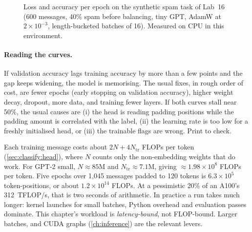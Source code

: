 \begin{figure}[ht]
\centering
{}
\caption{Loss and accuracy per epoch on the synthetic spam task of Lab~16 (600 messages,
40\% spam before balancing, tiny GPT, AdamW at $2\times10^{-3}$, length-bucketed batches
of 16). Measured on CPU in this environment.}
\label{fig:classify:curves}
\end{figure}

\paragraph{Reading the curves.} If validation accuracy lags training accuracy by more
than a few points and the gap keeps widening, the model is memorising. The usual fixes,
in rough order of cost, are fewer epochs (early stopping on validation accuracy),
higher weight decay, dropout, more data, and training fewer layers. If both curves
stall near 50\%, the usual causes are (i) the head is reading padding positions while
the padding amount is correlated with the label, (ii) the learning rate is too low for
a freshly initialised head, or (iii) the trainable flags are wrong. Print
 to check.

\begin{napkinmath}
Each training message costs about $2N + 4N_{\text{tr}}$ FLOPs per token
(\cref{sec:classify:head}), where $N$ counts only the non-embedding weights that do
work. For GPT-2 small, $N\approx 85$M and $N_{\text{tr}}\approx 7.1$M, giving
$\approx 1.98\times10^8$ FLOPs per token. Five epochs over 1{,}045 messages padded to
120 tokens is $6.3\times10^5$ token-positions, or about $1.2\times10^{14}$ FLOPs. At a
pessimistic 20\% of an A100's \SI{312}{TFLOP/s}, that is two seconds of arithmetic. In
practice a run takes much longer: kernel launches for small batches, Python overhead
and evaluation passes dominate. This chapter's workload is \emph{latency-bound}, not
FLOP-bound. Larger batches,  and CUDA graphs (\cref{ch:inference})
are the relevant levers.
\end{napkinmath}


